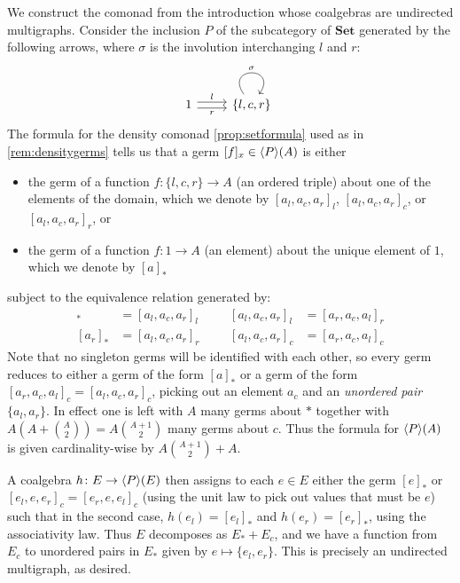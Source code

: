 \documentclass[11pt, oneside, article]{memoir}
\theoremstyle{plain}
\theoremstyle{definition}
\theoremstyle{remark}
\newenvironment{example}
{\renewcommand\qedsymbol{$\lrcorner$}%
  \pushQED{\qed}\myexample}
{\popQED\endmyexample}
\DeclarePairedDelimiter{\gen}{\langle}{\rangle}
\newcommand{\namedcat}[1]{\mathbf{#1}}
\newcommand{\Set}{\namedcat{Set}}
\newcommand{\ph}[1]{#1}
\newcommand{\setof}[1]{\{#1\}}
\newcommand{\eE}{E}
\newcommand{\xA}{A}
\newcommand{\hH}{h}
\newcommand{\pP}{\ph{P}}
\newcommand{\cP}{\gen{\pP}}
\begin{document}
\begin{example}[Undirected multigraphs]\label{ex:undgraphs}
  We construct the comonad from the introduction whose coalgebras are
  undirected multigraphs. Consider the inclusion $\pP$ of the
  subcategory of $\Set$ generated by the following arrows, where
  $\sigma$ is the involution interchanging $l$ and $r$:
  \[\begin{tikzcd}
      1 & {\setof{l,c,r}}
      \arrow["r"', shift right, from=1-1, to=1-2]
      \arrow["l", shift left, from=1-1, to=1-2]
      \arrow["\sigma", from=1-2, to=1-2, loop, in=55, out=125, distance=10mm]
    \end{tikzcd}\]
  The formula for the density comonad 
  \cref{prop:setformula} used as in \cref{rem:densitygerms} tells us that a germ
  $[f]_x \in \cP(\xA)$ is either 
  \begin{itemize}
  \item the germ of a function $f \colon \{l,c,r\} \to \xA$ (an ordered triple)
    about one of the elements of the domain, which we denote by
    $[a_l, a_c, a_r]_l$, $[a_l, a_c, a_r]_c$, or $[a_l, a_c, a_r]_r$, or
  \item the germ of a function $f \colon 1 \to \xA$ (an element) about
    the unique element of $1$, which we denote by $[a]_\ast$
  \end{itemize}
  subject to the equivalence relation generated by:
  \begin{align*}
    [a_l]_\ast&=[a_l,a_c,a_r]_l&&&[a_l,a_c,a_r]_l&=[a_r,a_c,a_l]_r\\
    [a_r]_\ast&=[a_l,a_c,a_r]_r&&&[a_l,a_c,a_r]_c&=[a_r,a_c,a_l]_c
  \end{align*}
  Note that no singleton germs will be identified with each other, so
  every germ reduces to either a germ of the form $[a]_\ast$ or a germ
  of the form $[a_r,a_c,a_l]_c = [a_l,a_c,a_r]_c$, picking out an
  element $a_c$ and an \emph{unordered pair} $\setof{a_l, a_r}$. In
  effect one is left with $\xA$ many germs about $\ast$ together with
  $\xA\left(\xA + {\xA\choose 2}\right)=\xA{\xA+1\choose 2}$ many
  germs about $c$. Thus the formula for $\cP(\xA)$ is given
  cardinality-wise by $\xA{\xA+1\choose 2}+\xA$.

  A coalgebra $\hH\colon \eE\to \cP(\eE)$ then assigns to each
  $e\in \eE$ either the germ $[e]_\ast$ or
  $[e_l,e,e_r]_c = [e_r,e,e_l]_c$ (using the unit law to pick out
  values that must be $e$) such that in the second case,
  $h(e_l)=[e_l]_\ast$ and $h(e_r)=[e_r]_\ast$, using the associativity
  law. Thus $\eE$ decomposes as $\eE_\ast+\eE_c$, and we have a
  function from $\eE_c$ to unordered pairs in $\eE_\ast$ given by
  $e\mapsto \setof{e_l,e_r}$. This is precisely an undirected multigraph,
  as desired.


\end{example}
\end{document}

